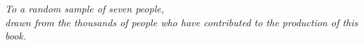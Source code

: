 \cleardoublepage
\thispagestyle{empty}
\begin{center}
\Large\itshape
To a random sample of seven people,\\ 
drawn from the thousands of people who have contributed to the production of this book.
\end{center}
